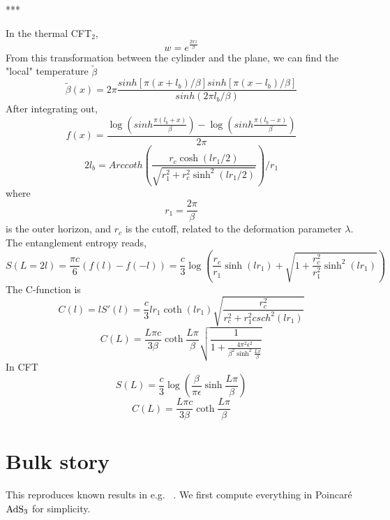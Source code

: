\documentclass[11pt,a4paper,utf8]{article}
\begin{document}
	***
	
	In the thermal CFT$_2$,
	\begin{equation}
	w=e^{\frac{2\pi z}{\beta}}
	\end{equation}
	From this transformation between the cylinder and the plane, we can find the "local" temperature $\tilde{\beta}$
	\begin{equation}
	\tilde{\beta}(x)=2\pi\frac{sinh[\pi(x+l_b)/\beta]sinh[\pi(x-l_b)/\beta]}{sinh(2\pi l_b/\beta)}
	\end{equation}
	After integrating out,
	\begin{equation}
	f(x)=\frac{\log(sinh\frac{\pi(l_b+x)}{\beta})-\log(sinh\frac{\pi(l_b-x)}{\beta})}{2\pi}
	\end{equation}
	\begin{equation}
	2l_b=Arccoth(\frac{r_c\cosh(lr_1/2)}{\sqrt{r_1^2+r_c^2\sinh^2(lr_1/2)}})/r_1
	\end{equation}
	where
	\begin{equation}
	r_1=\frac{2\pi}{\beta}
	\end{equation}
	is the outer horizon, and $r_c$ is the cutoff, related to the deformation parameter $\lambda$. The entanglement entropy reads,
	\begin{equation}
	S(L=2l)=\frac{\pi c}{6}(f(l)-f(-l))=\frac{c}{3}\log(\frac{r_c}{r_1}\sinh(l r_1)+\sqrt{1+\frac{r_c^2}{r_1^2}\sinh^2(l r_1)})
	\end{equation}
	The C-function is
	\begin{equation}
	C(l)=lS'(l)=\frac{c}{3}lr_1\coth(lr_1)\sqrt{\frac{r_c^2}{r_c^2+r_1^2csch^2(l r_1)}}
	\end{equation}
	\begin{equation}
	C(L)=\frac{L\pi c}{3\beta}\coth\frac{L\pi}{\beta}\sqrt{\frac{1}{1+\frac{4\pi^2\epsilon^2}{\beta^2\sinh^2\frac{L\pi}{\beta}}}}
	\end{equation}
	In CFT
	\begin{equation}
	S(L)=\frac{c}{3}\log(\frac{\beta}{\pi \epsilon}\sinh\frac{L\pi}{\beta})
	\end{equation}
	\begin{equation}C(L)=\frac{L\pi c}{3\beta}\coth\frac{L\pi}{\beta}
	\end{equation}
	
\section{Bulk story}
	This reproduces known results in e.g.~\cite{Lashkari:2016idm,Czech:2019vih,Apolo:2020qjm} . We first compute everything in Poincar\'e $\mathrm{AdS}_3$ for simplicity. 
\end{document}
